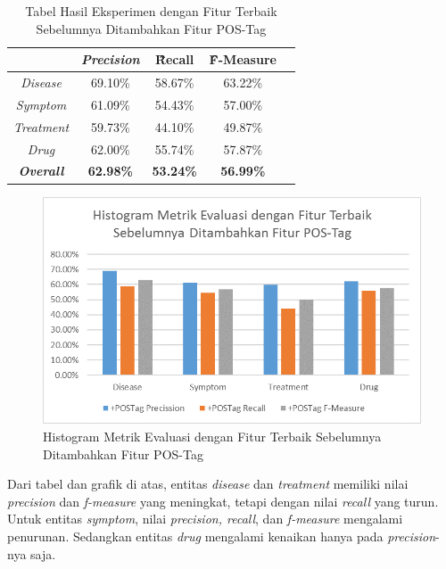 	\begin{table}
		\centering
		\caption{Tabel Hasil Eksperimen dengan Fitur Terbaik Sebelumnya Ditambahkan Fitur POS-Tag}
		\begin{tabular}{|c|c|c|c|c|}
			\hline
								  & \textit{Precision} & \f{\f{Recall}} & \f{\f{F-Measure}} \\ \hline
			\textit{Disease}      & 69.10\%             & 58.67\%        & 63.22\%           \\ \hline
			\textit{Symptom}      & 61.09\%             & 54.43\%        & 57.00\%           \\ \hline
			\textit{Treatment}    & 59.73\%             & 44.10\%        & 49.87\%           \\ \hline
			\textit{Drug}		  & 62.00\%             & 55.74\%        & 57.87\%           \\ \hline
			\textit{\textbf{Overall}}&\textbf{62.98\%}  & \textbf{53.24\%}& \textbf{56.99\%} \\ \hline
		\end{tabular}
		\label{table:owndict4}
	\end{table}
	
	\begin{figure}
		\centering
		\includegraphics[width=0.85\linewidth]{images/histogram4}
		\caption{Histogram Metrik Evaluasi dengan Fitur Terbaik Sebelumnya Ditambahkan Fitur POS-Tag}
		\label{fig:owndict4}
	\end{figure}
	
	Dari tabel dan grafik di atas, entitas \textit{disease} dan \textit{treatment} memiliki nilai \textit{precision} dan \textit{f-measure} yang meningkat, tetapi dengan nilai \textit{recall} yang turun. Untuk entitas \textit{symptom}, nilai \textit{precision, recall}, dan \textit{f-measure} mengalami penurunan. Sedangkan entitas \textit{drug} mengalami kenaikan hanya pada \textit{precision}-nya saja.
	
